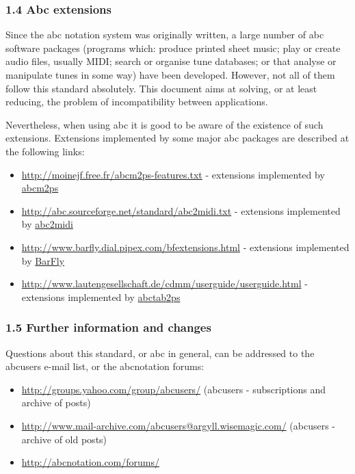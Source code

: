 \hypertarget{abc_extensions}{\subsubsection{1.4 Abc
extensions}\label{abc_extensions}}

Since the abc notation system was originally written, a large number of
abc software packages (programs which: produce printed sheet music; play
or create audio files, usually MIDI; search or organise tune databases;
or that analyse or manipulate tunes in some way) have been developed.
However, not all of them follow this standard absolutely. This document
aims at solving, or at least reducing, the problem of incompatibility
between applications.

Nevertheless, when using abc it is good to be aware of the existence of
such extensions. Extensions implemented by some major abc packages are
described at the following links:

\begin{itemize}
\item
  \url{http://moinejf.free.fr/abcm2ps-features.txt} - extensions
  implemented by
  \href{http://abcnotation.com/software\#abcm2ps}{abcm2ps}
\item
  \url{http://abc.sourceforge.net/standard/abc2midi.txt} - extensions
  implemented by
  \href{http://abcnotation.com/software\#abcMIDI}{abc2midi}
\item
  \url{http://www.barfly.dial.pipex.com/bfextensions.html} - extensions
  implemented by \href{http://abcnotation.com/software\#BarFly}{BarFly}
\item
  \url{http://www.lautengesellschaft.de/cdmm/userguide/userguide.html} -
  extensions implemented by
  \href{http://abcnotation.com/software\#abctab2ps}{abctab2ps}
\end{itemize}

\hypertarget{further_information_and_changes}{\subsubsection{1.5 Further
information and changes}\label{further_information_and_changes}}

Questions about this standard, or abc in general, can be addressed to
the abcusers e-mail list, or the abcnotation forums:

\begin{itemize}
\item
  \url{http://groups.yahoo.com/group/abcusers/} (abcusers -
  subscriptions and archive of posts)
\item
  \url{http://www.mail-archive.com/abcusers@argyll.wisemagic.com/}
  (abcusers - archive of old posts)
\item
  \url{http://abcnotation.com/forums/}
\end{itemize}

